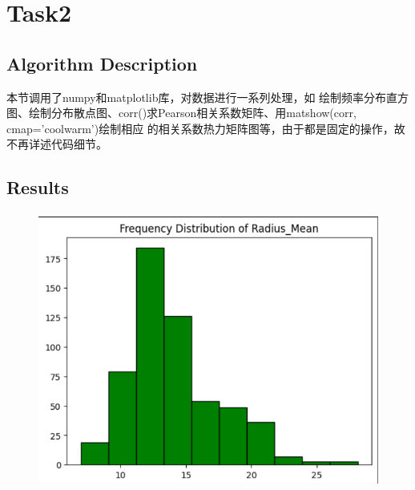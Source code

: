 \documentclass{ctexart}
\begin{document}
    \section{Task2}
    \subsection{Algorithm Description}
	
	本节调用了numpy和matplotlib库，对数据进行一系列处理，如
	绘制频率分布直方图、绘制分布散点图、corr()求Pearson相关系数矩阵、用matshow(corr, cmap='coolwarm')绘制相应
	的相关系数热力矩阵图等，由于都是固定的操作，故不再详述代码细节。
\subsection{Results}
\begin{figure}[H]
	\centering 
	\includegraphics[height=9cm,width=14cm]{3.png}
	\end{figure}
\end{document}
